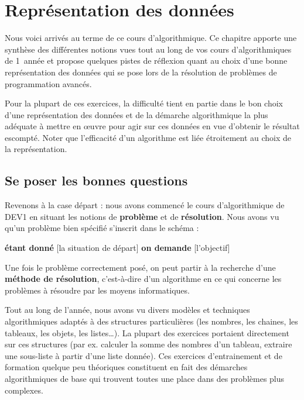 \chapter{Représentation des données}

	Nous voici arrivés au terme de ce cours d'algorithmique. 
	Ce chapitre apporte une synthèse des différentes notions vues 
	tout au long de vos cours d'algorithmiques de 1\iere\ année 
	et propose quelques pistes de réflexion 
	quant au choix d’une bonne représentation des données 
	qui se pose lors de la résolution de problèmes de programmation avancés.
	
	Pour la plupart de ces exercices,
	la difficulté tient en partie dans le bon choix d’une représentation des données 
	et de la démarche algorithmique la plus adéquate à mettre en \oe{}uvre 
	pour agir sur ces données en vue d’obtenir le résultat escompté. 
	Noter que l’efficacité d’un algorithme 
	est liée étroitement au choix de la représentation.

\section{Se poser les bonnes questions}

	Revenons à la case départ : 
	nous avons commencé le cours d'algorithmique de DEV1
	en situant les notions de \textbf{problème} et de \textbf{résolution}. 
	Nous avons vu qu’un problème bien spécifié s’inscrit dans le schéma :
	
		\begin{center}
		\begin{Ovalbox}
			{\textbf{étant donné} [la situation de départ] 
			\textbf{on demande} [l’objectif]}
		\end{Ovalbox}
		\end{center}
	
	Une fois le problème correctement posé, 
	on peut partir à la recherche d’une \textbf{méthode de résolution}, 
	c’est-à-dire d’un algorithme en ce qui concerne les problèmes 
	à résoudre par les moyens informatiques.
	
	Tout au long de l’année, 
	nous avons vu divers modèles et techniques algorithmiques adaptés 
	à des structures particulières 
	(les nombres, les chaines, les tableaux, les objets, les listes\dots). 
	La plupart des exercices portaient directement sur ces structures 
	(par ex. calculer la somme des nombres d’un tableau,
	extraire une sous-liste à partir d’une liste donnée). 
	Ces exercices d’entrainement et de formation quelque peu théoriques 
	constituent en fait des démarches algorithmiques de base 
	qui trouvent toutes une place dans des problèmes plus complexes.
	
